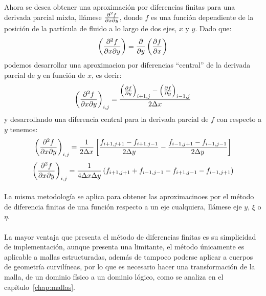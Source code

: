\documentclass[letterpaper, openright, 12pt]{book}
\begin{document}
    \paragraph*{}
    Ahora se desea obtener una aproximación por diferencias finitas para una
    derivada parcial mixta, llámese $\pdv{f}{x}{y}$, donde $f$ es una función
    dependiente de la posición de la partícula de fluido a lo largo de dos ejes,
    $x$ y $y$. Dado que:
    \begin{equation}
    \left( \pdv{f}{x}{y} \right) = \pdv{y} \left( \pdv{f}{x} \right)
    \end{equation}
    podemos desarrollar una aproximacion por diferencias ``central'' de la
    derivada parcial de $y$ en función de $x$, es decir:
    \begin{equation}
    \left( \pdv{f}{x}{y} \right)_{i,j} = \frac{\left( \pdv{f}{y} \right)_{i+1, j} - \left( \pdv{f}{y} \right)_{i-1,j}}{2 \Delta x}
    \end{equation}
    y desarrollando una diferencia central para la derivada parcial de $f$ con
    respecto a $y$ tenemos:
    \begin{equation}
    \left( \pdv{f}{x}{y} \right)_{i,j} = \frac{1}{2 \Delta x} \left[ \frac{f_{i+1, j+1} - f_{i+1, j-1}}{2 \Delta y} - \frac{f_{i-1, j+1} - f_{i-1, j-1}}{2 \Delta y} \right]
    \end{equation}
    \begin{equation}
    \left( \pdv{f}{x}{y} \right)_{i,j} = \frac{1}{4 \Delta x \Delta y} \left( f_{i+1, j+1} + f_{i-1, j-1} - f_{i+1, j-1} - f_{i-1, j+1} \right)
    \end{equation}

    \paragraph*{}
    La misma metodología se aplica para obtener las aproximacinoes por el método
    de diferencia finitas de una función respecto a un eje cualquiera, llámese
    eje $y$, $\xi$ o $\eta$.

    \paragraph*{}
    La mayor ventaja que presenta el método de diferencias finitas es su
    simplicidad de implementación, aunque presenta una limitante, el método
    únicamente es aplicable a mallas estructuradas, además de tampoco poderse
    aplicar a cuerpos de geometría curvilíneas, por lo que es necesario hacer una
    transformación de la malla, de un dominio físico a un dominio lógico, como
    se analiza en el capítulo~\ref{chap:mallas}.
\end{document}
